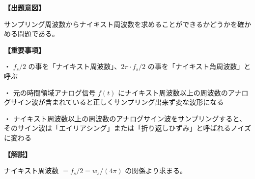 \noindent \textbf{【出題意図】}

\noindent サンプリング周波数からナイキスト周波数を求めることができるかどうかを確かめる問題である。

\vspace{1em}
\noindent \textbf{【重要事項】}

\medskip
\noindent ・ $f_s/2$ の事を「ナイキスト周波数」、$2\pi \cdot f_s/2$ の事を「ナイキスト角周波数」と呼ぶ

\medskip
\noindent ・ 元の時間領域アナログ信号 $f(t)$ にナイキスト周波数以上の周波数のアナログサイン波が含まれていると正しくサンプリング出来ず変な波形になる

\medskip
\noindent ・ ナイキスト周波数以上の周波数のアナログサイン波をサンプリングすると、そのサイン波は「エイリアシング」または「折り返しひずみ」と呼ばれるノイズに変わる

\vspace{1em}
\noindent \textbf{【解説】}

\noindent ナイキスト周波数 $ = f_s/2 = w_s/(4\pi)$ の関係より求まる。
